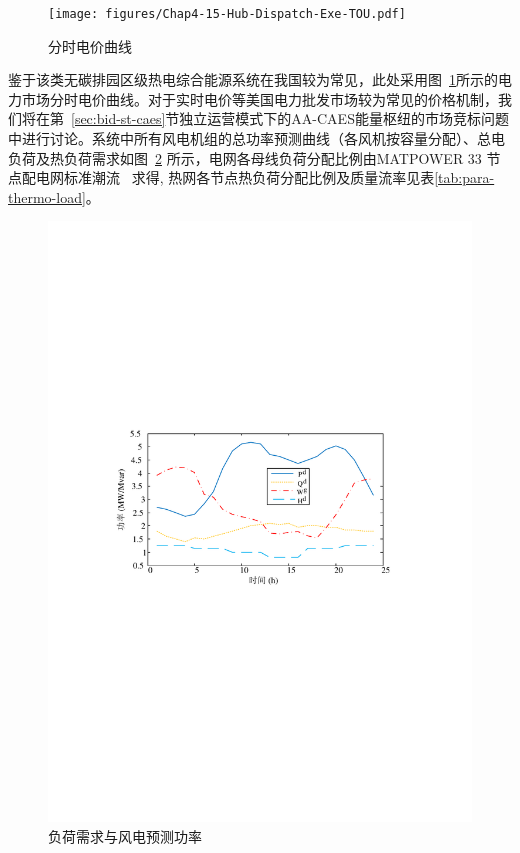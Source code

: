 \begin{figure}[H]
\centering
\texttt{[image: figures/Chap4-15-Hub-Dispatch-Exe-TOU.pdf]}
\caption{分时电价曲线}
\label{Fig:Hub-Dispatch-Exe-TOU}
\end{figure}

鉴于该类无碳排园区级热电综合能源系统在我国较为常见，此处采用图~\ref{Fig:Hub-Dispatch-Exe-TOU}所示的电力市场分时电价曲线。对于实时电价等美国电力批发市场较为常见的价格机制，我们将在第~\ref{sec:bid-st-caes}节独立运营模式下的AA-CAES能量枢纽的市场竞标问题中进行讨论。系统中所有风电机组的总功率预测曲线（各风机按容量分配）、总电负荷及热负荷需求如图~\ref{Fig:Hub-Dispatch-Exe-PQWHG} 所示，电网各母线负荷分配比例由MATPOWER 33 节点配电网标准潮流~\cite{MATPOWER} 求得, 热网各节点热负荷分配比例及质量流率见表\ref{tab:para-thermo-load}。

\begin{figure}[H]
\centering
\includegraphics[scale=0.81]{figures/Chap4-15-Hub-Dispatch-Exe-PQWHG.pdf}
\caption{负荷需求与风电预测功率}
\label{Fig:Hub-Dispatch-Exe-PQWHG}
\end{figure}

